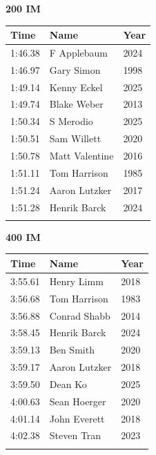 \vspace{1.2em}
\noindent\begin{minipage}[t]{0.48\textwidth}
\centering
\textbf{\textcolor{teamprimary}{200 IM}}\par
\vspace{0.5em}
\centering
\small
\renewcommand{\arraystretch}{1.0}
\setlength{\tabcolsep}{4pt}
\begin{tabular}{@{}p{1.8cm}p{3.0cm}p{1.0cm}@{}}
\toprule
\textbf{Time} & \textbf{Name} & \textbf{Year} \\
\midrule
1:46.38 & F Applebaum & 2024 \\
1:46.97 & Gary Simon & 1998 \\
1:49.14 & Kenny Eckel & 2025 \\
1:49.74 & Blake Weber & 2013 \\
1:50.34 & S Merodio & 2025 \\
1:50.51 & Sam Willett & 2020 \\
1:50.78 & Matt Valentine & 2016 \\
1:51.11 & Tom Harrison & 1985 \\
1:51.24 & Aaron Lutzker & 2017 \\
1:51.28 & Henrik Barck & 2024 \\
\bottomrule
\vspace{0.5em}
\end{tabular}
\end{minipage}
\hfill
\begin{minipage}[t]{0.48\textwidth}
\centering
\textbf{\textcolor{teamprimary}{400 IM}}\par
\vspace{0.5em}
\centering
\small
\renewcommand{\arraystretch}{1.0}
\setlength{\tabcolsep}{4pt}
\begin{tabular}{@{}p{1.8cm}p{3.0cm}p{1.0cm}@{}}
\toprule
\textbf{Time} & \textbf{Name} & \textbf{Year} \\
\midrule
3:55.61 & Henry Limm & 2018 \\
3:56.68 & Tom Harrison & 1983 \\
3:56.88 & Conrad Shabb & 2014 \\
3:58.45 & Henrik Barck & 2024 \\
3:59.13 & Ben Smith & 2020 \\
3:59.17 & Aaron Lutzker & 2018 \\
3:59.50 & Dean Ko & 2025 \\
4:00.63 & Sean Hoerger & 2020 \\
4:01.14 & John Everett & 2018 \\
4:02.38 & Steven Tran & 2023 \\
\bottomrule
\vspace{0.5em}
\end{tabular}
\end{minipage}
